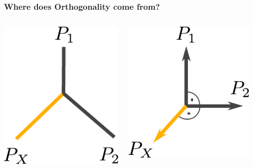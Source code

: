 \documentclass[11pt]{beamer}
\begin{document}
\begin{frame}
\frametitle{Where does Orthogonality come from?}
\begin{columns}
	\begin{column}{0.5\textwidth}
		\includegraphics{figures/f3_nonorthogonal.pdf}
	\end{column}
	\begin{column}{0.5\textwidth}
		\includegraphics{figures/f3_orthogonal.pdf}
	\end{column}
\end{columns}
\end{frame}
\end{document}
